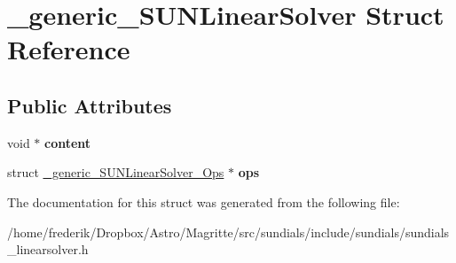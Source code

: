 \hypertarget{struct__generic__SUNLinearSolver}{}\section{\+\_\+generic\+\_\+\+S\+U\+N\+Linear\+Solver Struct Reference}
\label{struct__generic__SUNLinearSolver}
\subsection*{Public Attributes}
\begin{DoxyCompactItemize}
\item 
\mbox{\label{struct__generic__SUNLinearSolver_a00ff4d0d16957a2e7f67556d8b41bd36}} 
void $\ast$ {\bfseries content}
\item 
\mbox{\label{struct__generic__SUNLinearSolver_aec3f9222284f5350ca4c8c798b645da8}} 
struct \mbox{\hyperlink{struct__generic__SUNLinearSolver__Ops}{\+\_\+generic\+\_\+\+S\+U\+N\+Linear\+Solver\+\_\+\+Ops}} $\ast$ {\bfseries ops}
\end{DoxyCompactItemize}


The documentation for this struct was generated from the following file\+:\begin{DoxyCompactItemize}
\item 
/home/frederik/\+Dropbox/\+Astro/\+Magritte/src/sundials/include/sundials/sundials\+\_\+linearsolver.\+h\end{DoxyCompactItemize}
